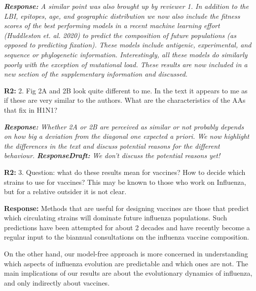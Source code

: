 \documentclass[aps,rmp,onecolumn]{revtex4-1}
\newcommand{\refb}[1]{\textbf{R2:} #1\vskip 5mm}
\newcommand{\response}[1]{{\it {\color{response}\textbf{Response:} #1}}\vskip 5mm}
\newcommand{\responsedraft}[1]{{\it {\color{purple}\textbf{ResponseDraft:} #1}}\vskip 5mm}
\begin{document}
\response{
	A similar point was also brought up by reviewer 1.
	In addition to the LBI, epitopes, age, and geographic distribution we now also include the fitness scores of the best performing models in a recent machine learning effort (Huddleston \emph{et. al.} 2020) to predict the composition of future populations (as opposed to predicting fixation).
	These models include antigenic, experimental, and sequence or phylogenetic information.
	Interestingly, all these models do similarly poorly with the exception of mutational load.
	These results are now included in a new section of the supplementary information and discussed.
}

\refb{2. Fig 2A and 2B look quite different to me. In the text it appears to me as if these are very similar to the authors. What are the characteristics of the AAs that fix in H1N1? }

\response{Whether 2A or 2B are perceived as similar or not probably depends on how big a deviation from the diagonal one expected a priori.
We now highlight the differences in the text and discuss potential reasons for the different behaviour.  }
\responsedraft{We don't discuss the potential reasons yet!}

\refb{3. Question: what do these results mean for vaccines? How to decide which strains to use for vaccines? This may be known to those who work on Influenza, but for a relative outsider it is not clear. }

\response{
	Methods that are useful for designing vaccines are those that predict which circulating strains will dominate future influenza populations.
	Such predictions have been attempted for about 2 decades and have recently become a regular input to the biannual consultations on the influenza vaccine composition.

	On the other hand, our model-free approach is more concerned in understanding which aspects of influenza evolution are predictable and which ones are not.
	The main implications of our results are about the evolutionary dynamics of influenza, and only indirectly about vaccines.  
}
\end{document}
